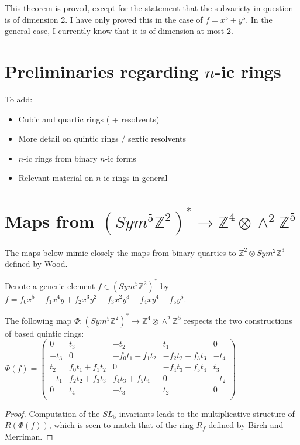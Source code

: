 \documentclass{article}
\begin{document}
This theorem is proved, except for the statement that the subvariety in question is of dimension 2.   I have only proved this in the case of $f = x^5 + y^5$.  In the general case, I currently know that it is of dimension at most 2.

\section{Preliminaries regarding $n$-ic rings}

To add:
\begin{itemize}
\item Cubic and quartic rings ( + resolvents)
\item More detail on quintic rings / sextic resolvents
\item $n$-ic rings from binary $n$-ic forms
\item Relevant material on $n$-ic rings in general
\end{itemize}

\section{Maps from $(Sym^5 \mathbb{Z}^2)^* \to \mathbb{Z}^4 \otimes \wedge^2 \mathbb{Z}^5$}

The maps below mimic closely the maps from binary quartics to $\mathbb{Z}^2 \otimes Sym^2 \mathbb{Z}^3$ defined by Wood.

Denote a generic element $f \in (Sym^5 \mathbb{Z}^2)^*$ by $f = f_0 x^5 + f_1 x^4 y + f_2 x^3 y^2 + f_3 x^2 y^3 + f_4 x y^4 + f_5 y^5$.

\begin{theorem} \label{Phi}
The following map $\Phi: (Sym^5 \mathbb{Z}^2)^* \to \mathbb{Z}^4 \otimes \wedge^2 \mathbb{Z}^5$ respects the two constructions of based quintic rings:\\

$\Phi(f) = \begin{pmatrix}
0 & t_3 & - t_2 & t_1 & 0\\
- t_3 & 0 & -  f_0 t_1 -  f_1 t_2 & -  f_2 t_2 -  f_3 t_3 & - t_4\\
t_2 &  f_0 t_1 +  f_1 t_2 & 0 & -  f_4 t_3 -  f_5 t_4 & t_3\\
- t_1 &  f_2 t_2 +  f_3 t_3 &  f_4 t_3 +  f_5 t_4 & 0 & - t_2\\
0 & t_4 & - t_3 & t_2 & 0\\
\end{pmatrix}$\\

\end{theorem}
\begin{proof}
Computation of the $SL_5$-invariants leads to the multiplicative structure of $R(\Phi(f))$, which is seen to match that of the ring $R_f$ defined by Birch and Merriman.
\end{proof}
\end{document}
